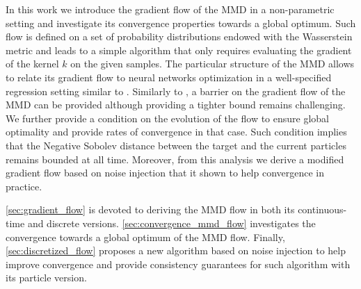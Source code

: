 In this work we introduce the gradient flow of the MMD in a non-parametric setting and investigate its convergence properties towards a global optimum. Such flow is defined on a set of probability distributions endowed with the Wasserstein metric and leads to a simple algorithm that only requires evaluating the gradient of the kernel $k$ on the given samples.
The particular structure of the MMD allows to relate its gradient flow to neural networks optimization in a well-specified regression setting similar to \cite{Rotskoff:2019}.
Similarly to \cite{Bottou:2017}, a barrier on the gradient flow of the MMD can be provided although providing a tighter bound remains challenging.
We further provide a condition on the evolution of the flow to ensure global optimality and provide rates of convergence in that case. Such condition implies that the Negative Sobolev distance between the target and the current particles remains bounded at all time.
Moreover, from this analysis we derive a modified gradient flow based on noise injection that it shown to help convergence in practice.

\cref{sec:gradient_flow} is devoted to deriving the MMD flow in both its continuous-time and discrete versions. \cref{sec:convergence_mmd_flow} investigates the convergence towards a global optimum of the MMD flow. Finally, \cref{sec:discretized_flow} proposes a new algorithm based on noise injection to help improve convergence and provide consistency guarantees for such algorithm with its particle version.  


